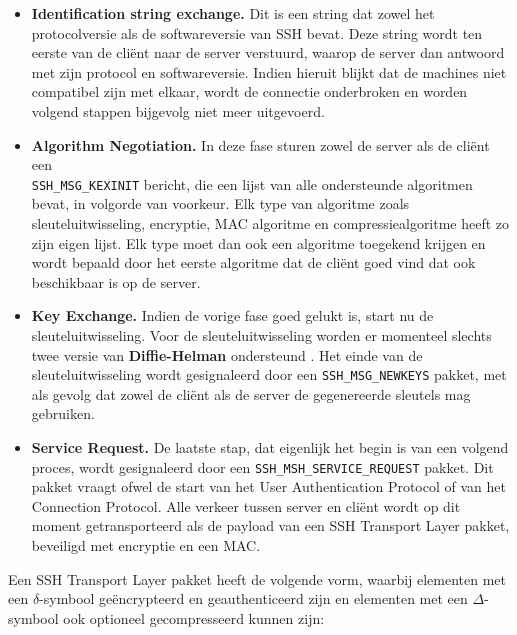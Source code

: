 \documentclass{report}
\begin{document}
	\begin{itemize}
		\item \textbf{Identification string exchange.} Dit is een string dat zowel het protocolversie als de softwareversie van SSH bevat. Deze string wordt ten eerste van de cliënt naar de server verstuurd, waarop de server dan antwoord met zijn protocol en softwareversie. Indien hieruit blijkt dat de machines niet compatibel zijn met elkaar, wordt de connectie onderbroken  en worden volgend stappen bijgevolg niet meer uitgevoerd.
		\item \textbf{Algorithm Negotiation.} In deze fase sturen zowel de server als de cliënt een \\ \texttt{SSH\_MSG\_KEXINIT} bericht, die een lijst van alle ondersteunde algoritmen bevat, in volgorde van voorkeur. Elk type van algoritme zoals sleuteluitwisseling, encryptie, MAC algoritme en compressiealgoritme heeft zo zijn eigen lijst. Elk type moet dan ook een algoritme toegekend krijgen en wordt bepaald door het eerste algoritme dat de cliënt goed vind dat ook beschikbaar is op de server.
		\item \textbf{Key Exchange.} Indien de vorige fase goed gelukt is, start nu de sleuteluitwisseling. Voor de sleuteluitwisseling worden er momenteel slechts twee versie van \textbf{Diffie-Helman} ondersteund . Het einde van de sleuteluitwisseling wordt gesignaleerd door een \texttt{SSH\_MSG\_NEWKEYS} pakket, met als gevolg dat zowel de cliënt als de server de gegenereerde sleutels mag gebruiken.  
		\item \textbf{Service Request.} De laatste stap, dat eigenlijk het begin is van een volgend proces, wordt gesignaleerd door een \texttt{SSH\_MSH\_SERVICE\_REQUEST} pakket. Dit pakket vraagt ofwel de start van het User Authentication Protocol of van het Connection Protocol. Alle verkeer tussen server en cliënt wordt op dit moment getransporteerd als de payload van een SSH Transport Layer pakket, beveiligd met encryptie en een MAC.
	\end{itemize}
	Een SSH Transport Layer pakket heeft de volgende vorm, waarbij elementen met een $\delta$-symbool geëncrypteerd en geauthenticeerd zijn en elementen met een $\Delta$-symbool ook optioneel gecompresseerd kunnen zijn:
\end{document}
